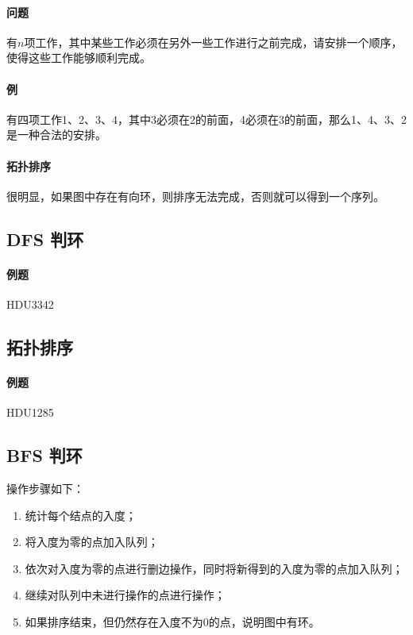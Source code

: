 \paragraph{问题} 有$n$项工作，其中某些工作必须在另外一些工作进行之前完成，请安排一个顺序，使得这些工作能够顺利完成。

\paragraph{例} 有四项工作1、2、3、4，其中3必须在2的前面，4必须在3的前面，那么1、4、3、2是一种合法的安排。

\paragraph{拓扑排序} 很明显，如果图中存在有向环，则排序无法完成，否则就可以得到一个序列。

\subsection{DFS 判环}

\paragraph{例题} HDU3342



\subsection{拓扑排序}

\paragraph{例题} HDU1285



\subsection{BFS 判环}

操作步骤如下：

\begin{enumerate}
  \item 统计每个结点的入度；
  \item 将入度为零的点加入队列；
  \item 依次对入度为零的点进行删边操作，同时将新得到的入度为零的点加入队列；
  \item 继续对队列中未进行操作的点进行操作；
  \item 如果排序结束，但仍然存在入度不为0的点，说明图中有环。
\end{enumerate}

